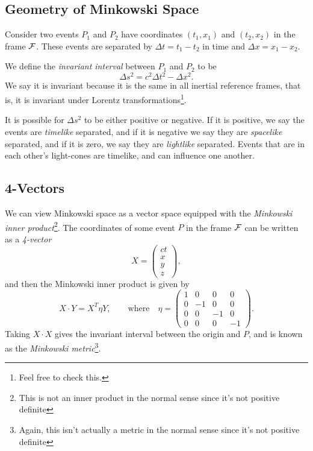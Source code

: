 \documentclass[11pt, a4paper]{scrartcl}
\theoremstyle{definition}
\begin{document}
\subsection*{Geometry of Minkowski Space}

Consider two events $P_1$ and $P_2$ have coordinates $(t_1, x_1)$ and $(t_2, x_2)$ in the frame $\mathcal{F}$. These events are separated by $\Delta t = t_1 - t_2$ in time and $\Delta x = x_1 - x_2$.

We define the \emph{invariant interval} between $P_1$ and $P_2$ to be
$$
\Delta s^2 = c^2 \Delta t^2 - \Delta x^2.
$$
We say it is invariant because it is the same in all inertial reference frames, that is, it is invariant under Lorentz transformations\footnote{Feel free to check this.}.

It is possible for $\Delta s^2$ to be either positive or negative. If it is positive, we say the events are \emph{timelike} separated, and if it is negative we say they are \emph{spacelike} separated, and if it is zero, we say they are \emph{lightlike} separated. Events that are in each other's light-cones are timelike, and can influence one another.

\subsection*{4-Vectors}

We can view Minkowski space as a vector space equipped with the \emph{Minkowski inner product}\footnote{This is not an inner product in the normal sense since it's not positive definite}. The coordinates of some event $P$ in the frame $\mathcal{F}$ can be written as a \emph{4-vector}
$$	
X= \begin{pmatrix}
	ct \\ x \\ y \\ z
\end{pmatrix},
$$
and then the Minkowski inner product is given by
$$
X \cdot Y = X^T \eta Y, \quad \quad \text{where} \quad \eta = \begin{pmatrix}
	1 & 0 & 0 & 0 \\
	0 & -1 & 0 & 0 \\
	0 & 0 & -1 & 0 \\
	0 & 0 & 0 & -1
\end{pmatrix}.
$$
Taking $X \cdot X$ gives the invariant interval between the origin and $P$, and is known as the \emph{Minkowski metric}\footnote{Again, this isn't actually a metric in the normal sense since it's not positive definite}.
\end{document}
